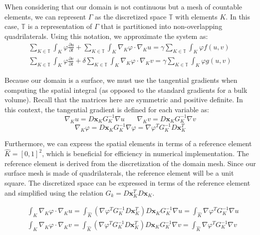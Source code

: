\documentclass[12pt]{article}
\begin{document}
When considering that our domain is not continuous but a mesh of countable elements, we can represent $\Gamma$ as the discretized space $\mathbb{T}$ with elements $K$. In this case, $\mathbb{T}$ is a representation of $\Gamma$ that is partitioned into non-overlapping quadrilaterals. Using this notation, we approximate the system as:
\begin{equation}
\begin{aligned}
\sum_{K\in\mathbb{T}} 
\int_K \varphi\frac{\partial u}{\partial t} + 
\sum_{K\in\mathbb{T}}
\int_K \nabla_K\varphi\cdot\nabla_K u = 
\gamma\sum_{K\in\mathbb{T}}
\int_K \varphi f(u,v) \\
\sum_{K\in\mathbb{T}}
\int_K \varphi\frac{\partial v}{\partial t} + 
\delta\sum_{K\in\mathbb{T}}
\int_K \nabla_K\varphi\cdot\nabla_K v =
\gamma\sum_{K\in\mathbb{T}}
\int_K \varphi g(u,v)
\end{aligned}
\end{equation}

Because our domain is a surface, we must use the tangential gradients when computing the spatial integral (as opposed to the standard gradients for a bulk volume). Recall that the matrices here are symmetric and positive definite. In this context, the tangential gradient is defined for each variable as:
$$\nabla_K u = D\textbf{x}_K G^{-1}_K\nabla u	~~~~~~~~
\nabla_K v = D\textbf{x}_K G^{-1}_K\nabla v$$
$$
\nabla_K \varphi = D\textbf{x}_K G^{-1}_K\nabla \varphi = \nabla \varphi^T G^{-1}_K D\textbf{x}_K^T$$

Furthermore, we can express the spatial elements in terms of a  reference element $\hat{K} = [0,1]^2$, which is beneficial for efficiency in numerical implementation. The reference element is derived from the discretization of the domain mesh. Since our surface mesh is made of quadrilaterals, the reference element will be a unit square. The discretized space can be expressed in terms of the reference element and simplified using the relation $G_k = D\textbf{x}_K^T D\textbf{x}_K$.


\begin{equation}\label{eq:tanint}
\begin{aligned}
&\int_K \nabla_K\varphi\cdot\nabla_K u = \int_{\hat{K}}   \left(\nabla \varphi^T G^{-1}_K D\textbf{x}_K^T\right) D\textbf{x}_K G^{-1}_K\nabla u = \int_{\hat{K}}  \nabla \varphi^T G^{-1}_K  \nabla u   \\
&\int_K \nabla_K\varphi\cdot\nabla_K v = \int_{\hat{K}}  \left(\nabla \varphi^T G^{-1}_K D\textbf{x}_K^T\right) D\textbf{x}_K G^{-1}_K\nabla v = \int_{\hat{K}}  \nabla \varphi^T G^{-1}_K  \nabla v 
\end{aligned}
\end{equation}
\end{document}
